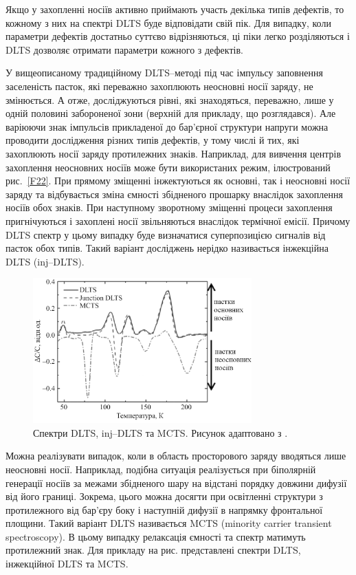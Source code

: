 \documentclass[10pt,a5paper,titlepage,oneside]{book}
\numberwithin{equation}{part}
\begin{document}
Якщо у захопленні носіїв активно приймають участь декілька типів дефектів, то кожному
з них на спектрі DLTS буде відповідати свій пік.
Для випадку, коли параметри дефектів достатньо суттєво відрізняються, ці піки легко розділяються
і DLTS дозволяє отримати параметри кожного з дефектів.


У вищеописаному традиційному DLTS--методі під час імпульсу заповнення заселеність пасток,
які переважно захоплюють неосновні носії заряду, не змінюється.
А отже, досліджуються рівні, які знаходяться, переважно, лише у одній половині  забороненої зони
(верхній для прикладу, що розглядався).
Але варіюючи знак імпульсів прикладеної до бар'єрної структури напруги можна
проводити дослідження різних типів дефектів, у тому числі й тих, які захоплюють носії заряду протилежних знаків.
Наприклад, для вивчення центрів захоплення неосновних носіїв може бути використаних режим,
ілюстрований рис.~\ref{F22}.
При прямому зміщенні інжектуються як основні, так і неосновні носії заряду та
відбувається зміна ємності збідненого прошарку внаслідок захоплення носіїв
обох знаків.
При наступному зворотному зміщенні процеси захоплення пригнічуються і
захоплені носії звільняються внаслідок термічної емісії.
Причому DLTS спектр у цьому випадку буде визначатися суперпозицією сигналів
від пасток обох типів.
Такий варіант досліджень нерідко називається інжекційна DLTS (inj--DLTS).

\begin{figure}[!b]
\center
\vspace{-5mm}
\includegraphics[width=0.75\textwidth]{Fig2_5}
\vspace{-3mm}
\caption{Спектри DLTS, inj--DLTS та MCTS.
Рисунок адаптовано з \cite{tuomisto2019}.
}
\vspace{-3mm}
\label{F25}
\end{figure}

Можна реалізувати випадок, коли в область просторового заряду вводяться лише неосновні носії.
Наприклад, подібна ситуація реалізується  при біполярній генерації носіїв за межами збідненого шару
на відстані порядку довжини дифузії від його границі.
Зокрема, цього можна досягти при освітленні структури з протилежного від бар'єру боку
і наступній дифузії в напрямку фронтальної площини.
Такий варіант DLTS називається MCTS (minority carrier transient spectroscopy).
В цьому випадку релаксація ємності та спектр матимуть протилежний знак.
Для прикладу на рис. представлені спектри DLTS, інжекційної DLTS та MCTS.
\end{document}
